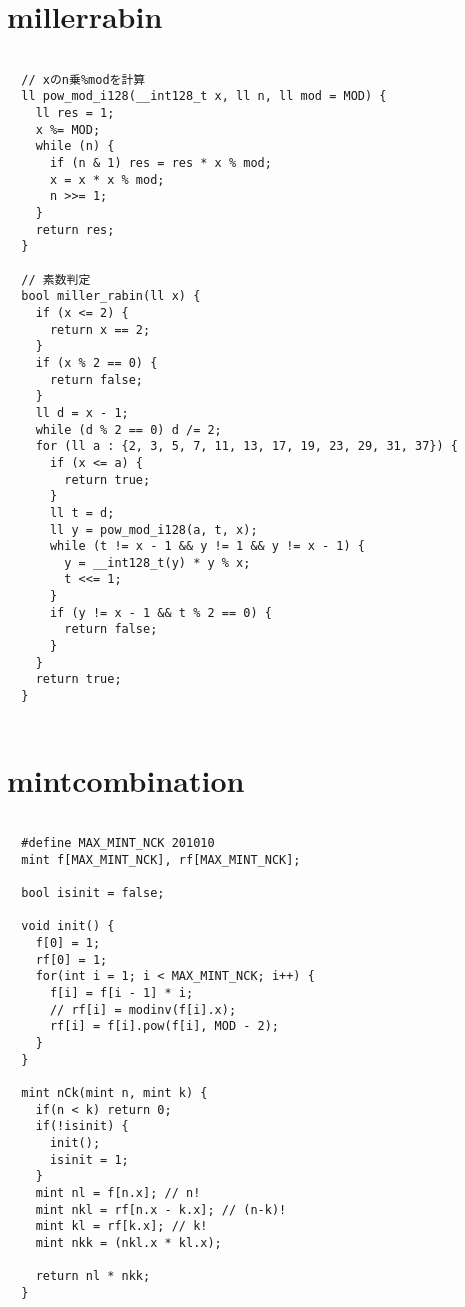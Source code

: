 \documentclass{jsarticle}
\begin{document}
\color{white}
\section{millerrabin}
\color{black}
\begin{lstlisting}[caption=millerrabin]

  // xのn乗%modを計算
  ll pow_mod_i128(__int128_t x, ll n, ll mod = MOD) {
    ll res = 1;
    x %= MOD;
    while (n) {
      if (n & 1) res = res * x % mod;
      x = x * x % mod;
      n >>= 1;
    }
    return res;
  }
  
  // 素数判定
  bool miller_rabin(ll x) {
    if (x <= 2) {
      return x == 2;
    }
    if (x % 2 == 0) {
      return false;
    }
    ll d = x - 1;
    while (d % 2 == 0) d /= 2;
    for (ll a : {2, 3, 5, 7, 11, 13, 17, 19, 23, 29, 31, 37}) {
      if (x <= a) {
        return true;
      }
      ll t = d;
      ll y = pow_mod_i128(a, t, x);
      while (t != x - 1 && y != 1 && y != x - 1) {
        y = __int128_t(y) * y % x;
        t <<= 1;
      }
      if (y != x - 1 && t % 2 == 0) {
        return false;
      }
    }
    return true;
  }
  

\end{lstlisting}

\color{white}
\section{mintcombination}
\color{black}
\begin{lstlisting}[caption=mintcombination]

  #define MAX_MINT_NCK 201010
  mint f[MAX_MINT_NCK], rf[MAX_MINT_NCK];
  
  bool isinit = false;
  
  void init() {
    f[0] = 1;
    rf[0] = 1;
    for(int i = 1; i < MAX_MINT_NCK; i++) {
      f[i] = f[i - 1] * i;
      // rf[i] = modinv(f[i].x);
      rf[i] = f[i].pow(f[i], MOD - 2);
    }
  }
  
  mint nCk(mint n, mint k) {
    if(n < k) return 0;
    if(!isinit) {
      init();
      isinit = 1;
    }
    mint nl = f[n.x]; // n!
    mint nkl = rf[n.x - k.x]; // (n-k)!
    mint kl = rf[k.x]; // k!
    mint nkk = (nkl.x * kl.x);
  
    return nl * nkk;
  }
  

\end{lstlisting}

\color{white}
\end{document}
